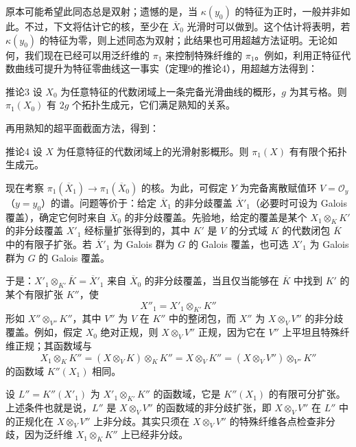 原本可能希望此同态总是双射；遗憾的是，当 $\kappa(y_0)$ 的特征为正时，一般并非如此。不过，下文将估计它的核，至少在 $\overline X_0$ 光滑时可以做到。这个估计将表明，若 $\kappa(y_0)$ 的特征为零，则上述同态为双射；此结果也可用超越方法证明。无论如何，我们现在已经可以用泛纤维的 $\pi_1$ 来控制特殊纤维的 $\pi_1$。例如，利用正特征代数曲线可提升为特征零曲线这一事实（定理9的推论4），用超越方法得到：
\begin{statement}{推论3}
设 $X_0$ 为任意特征的代数闭域上一条完备光滑曲线的概形，$g$ 为其亏格。则 $\pi_1(X_0)$ 有 $2g$ 个拓扑生成元，它们满足熟知的关系。
\end{statement}
再用熟知的超平面截面方法，得到：
\begin{statement}{推论4}
设 $X$ 为任意特征的代数闭域上的光滑射影概形。则 $\pi_1(X)$ 有有限个拓扑生成元。
\end{statement}
现在考察 $\pi_1(\overline X_1)\to\pi_1(\overline X_0)$ 的核。为此，可假定 $Y$ 为完备离散赋值环 $V=\mathcal O_y$（$y=y_0$）的谱。问题等价于：给定 $\overline X_1$ 的非分歧覆盖 $\overline X'_1$（必要时可设为 Galois 覆盖），确定它何时来自 $\overline X_0$ 的非分歧覆盖。先验地，给定的覆盖是某个 $X_1\otimes_KK'$ 的非分歧覆盖 $X'_1$ 经标量扩张得到的，其中 $K'$ 是 $V$ 的分式域 $K$ 的代数闭包 $\overline K$ 中的有限子扩张。若 $\overline X'_1$ 为 Galois 群为 $G$ 的 Galois 覆盖，也可选 $X'_1$ 为 Galois 群为 $G$ 的 Galois 覆盖。

于是：$X'_1\otimes_{K'}\overline K=\overline X'_1$ 来自 $\overline X_0$ 的非分歧覆盖，当且仅当能够在 $\overline K$ 中找到 $K'$ 的某个有限扩张 $K''$，使
\[
X''_1=X'_1\otimes_{K'}K''
\]
形如 $X''\otimes_{V''}K''$，其中 $V''$ 为 $V$ 在 $K''$ 中的整闭包，而 $X''$ 为 $X\otimes_VV''$ 的非分歧覆盖。例如，假定 $X_0$ 绝对正规，则 $X\otimes_VV''$ 正规，因为它在 $V''$ 上平坦且特殊纤维正规；其函数域与
\[
X_1\otimes_KK''=(X\otimes_VK)\otimes_KK''
=X\otimes_VK''=(X\otimes_VV'')\otimes_{V''}K''
\]
的函数域 $K''(X_1)$ 相同。

设 $L''=K''(X'_1)$ 为 $X'_1\otimes_{K'}K''$ 的函数域，它是 $K''(X_1)$ 的有限可分扩张。上述条件也就是说，$L''$ 是 $X\otimes_VV''$ 的函数域的非分歧扩张，即 $X\otimes_VV''$ 在 $L''$ 中的正规化在 $X\otimes_VV''$ 上非分歧。其实只须在 $X\otimes_VV''$ 的特殊纤维各点检查非分歧，因为泛纤维 $X_1\otimes_KK''$ 上已经非分歧。

